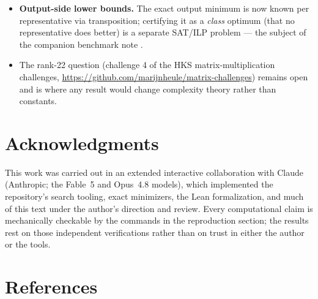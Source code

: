 \documentclass[10pt]{article}
\begin{document}
\begin{itemize}
  pairing the low-floor classes with exact output sides is the
  systematic search for a second record.
\item \textbf{Output-side lower bounds.} The exact output minimum is
  now known per representative via transposition; certifying it as a
  \emph{class} optimum (that no representative does better) is a
  separate SAT/ILP problem --- the subject of the companion benchmark
  note .
\item The rank-22 question (challenge 4 of the HKS
  matrix-multiplication challenges,
  \url{https://github.com/marijnheule/matrix-challenges}) remains open
  and is where any result would change complexity theory rather than
  constants.
\end{itemize}

\section*{Acknowledgments}

This work was carried out in an extended interactive collaboration
with Claude (Anthropic; the Fable~5 and Opus~4.8 models), which
implemented the repository's search tooling, exact minimizers, the
Lean formalization, and much of this text under the author's
direction and review. Every computational claim is mechanically
checkable by the commands in the reproduction section; the results
rest on those independent verifications rather than on trust in
either the author or the tools.

\section*{References}
\end{document}
